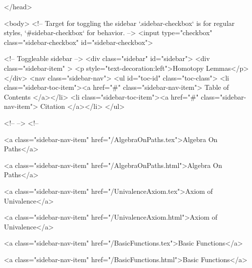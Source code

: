   
</head>




  <body>
    <!-- Target for toggling the sidebar `.sidebar-checkbox` is for regular
     styles, `#sidebar-checkbox` for behavior. -->
<input type="checkbox" class="sidebar-checkbox" id="sidebar-checkbox">

<!-- Toggleable sidebar -->
<div class="sidebar" id="sidebar">
  <div class="sidebar-item" >
    <p style="text-decoration:left">Homotopy Lemmas</p>
  </div>
  <nav class="sidebar-nav">
    <ul id="toc-id" class="toc-class">
  <li class="sidebar-toc-item"><a href="#" class="sidebar-nav-item"> Table of Contents </a></li>
  <li class="sidebar-toc-item"><a href="#" class="sidebar-nav-item"> Citation </a></li>
</ul>


    <!--  -->
    <!-- 
      
    
      
    
      
    
      
        
      
    
      
        
          <a class="sidebar-nav-item" href="/AlgebraOnPaths.tex">Algebra On Paths</a>
        
      
    
      
        
          <a class="sidebar-nav-item" href="/AlgebraOnPaths.html">Algebra On Paths</a>
        
      
    
      
        
          <a class="sidebar-nav-item" href="/UnivalenceAxiom.tex">Axiom of Univalence</a>
        
      
    
      
        
          <a class="sidebar-nav-item" href="/UnivalenceAxiom.html">Axiom of Univalence</a>
        
      
    
      
        
          <a class="sidebar-nav-item" href="/BasicFunctions.tex">Basic Functions</a>
        
      
    
      
        
          <a class="sidebar-nav-item" href="/BasicFunctions.html">Basic Functions</a>
        
      
    
      
        
